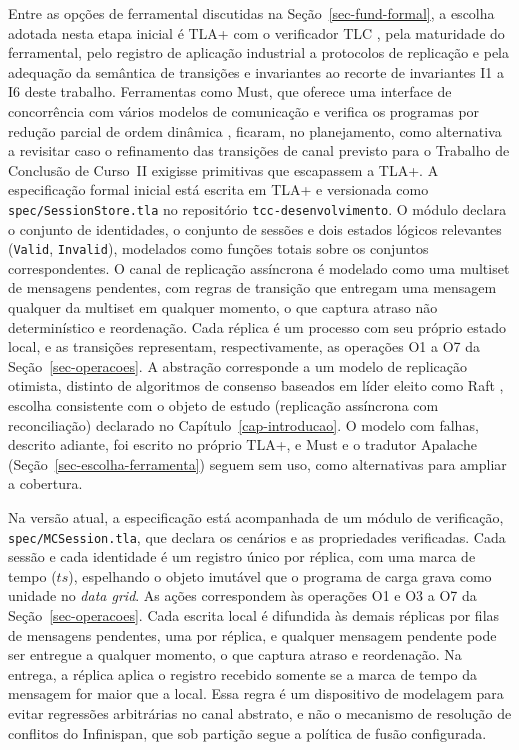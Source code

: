 Entre as opções de ferramental discutidas na Seção~\ref{sec-fund-formal}, a escolha adotada nesta etapa inicial é TLA+ com o verificador TLC \citep{yu_lamport_tla_modelchecking_1999}, pela maturidade do ferramental, pelo registro de aplicação industrial a protocolos de replicação \citep{newcombe_aws_tla_2014, newcombe_aws_formal_methods_2015} e pela adequação da semântica de transições e invariantes ao recorte de invariantes I1 a I6 deste trabalho. Ferramentas como Must, que oferece uma interface de concorrência com vários modelos de comunicação e verifica os programas por redução parcial de ordem dinâmica \citep{enea_must_2024}, ficaram, no planejamento, como alternativa a revisitar caso o refinamento das transições de canal previsto para o Trabalho de Conclusão de Curso~II exigisse primitivas que escapassem a TLA+. A especificação formal inicial está escrita em TLA+ e versionada como \texttt{spec/SessionStore.tla} no repositório \texttt{tcc-desenvolvimento}. O módulo declara o conjunto de identidades, o conjunto de sessões e dois estados lógicos relevantes (\texttt{Valid}, \texttt{Invalid}), modelados como funções totais sobre os conjuntos correspondentes. O canal de replicação assíncrona é modelado como uma multiset de mensagens pendentes, com regras de transição que entregam uma mensagem qualquer da multiset em qualquer momento, o que captura atraso não determinístico e reordenação. Cada réplica é um processo com seu próprio estado local, e as transições representam, respectivamente, as operações O1 a O7 da Seção~\ref{sec-operacoes}. A abstração corresponde a um modelo de replicação otimista, distinto de algoritmos de consenso baseados em líder eleito como Raft \citep{ongaro_raft_2014}, escolha consistente com o objeto de estudo (replicação assíncrona com reconciliação) declarado no Capítulo~\ref{cap-introducao}. O modelo com falhas, descrito adiante, foi escrito no próprio TLA+, e Must e o tradutor Apalache (Seção~\ref{sec-escolha-ferramenta}) seguem sem uso, como alternativas para ampliar a cobertura.

Na versão atual, a especificação está acompanhada de um módulo de verificação, \texttt{spec/MCSession.tla}, que declara os cenários e as propriedades verificadas. Cada sessão e cada identidade é um registro único por réplica, com uma marca de tempo ($ts$), espelhando o objeto imutável que o programa de carga grava como unidade no \emph{data grid}. As ações correspondem às operações O1 e O3 a O7 da Seção~\ref{sec-operacoes}. Cada escrita local é difundida às demais réplicas por filas de mensagens pendentes, uma por réplica, e qualquer mensagem pendente pode ser entregue a qualquer momento, o que captura atraso e reordenação. Na entrega, a réplica aplica o registro recebido somente se a marca de tempo da mensagem for maior que a local. Essa regra é um dispositivo de modelagem para evitar regressões arbitrárias no canal abstrato, e não o mecanismo de resolução de conflitos do Infinispan, que sob partição segue a política de fusão configurada.

